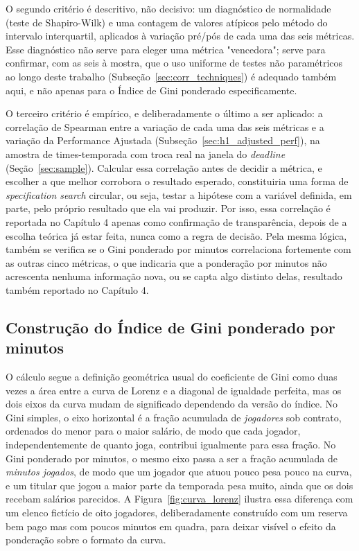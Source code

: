 O segundo critério é descritivo, não decisivo: um diagnóstico de normalidade (teste de Shapiro-Wilk) e uma contagem de valores atípicos pelo método do intervalo interquartil, aplicados à variação pré/pós de cada uma das seis métricas. Esse diagnóstico não serve para eleger uma métrica "vencedora"; serve para confirmar, com as seis à mostra, que o uso uniforme de testes não paramétricos ao longo deste trabalho (Subseção~\ref{sec:corr_techniques}) é adequado também aqui, e não apenas para o Índice de Gini ponderado especificamente.

O terceiro critério é empírico, e deliberadamente o último a ser aplicado: a correlação de Spearman entre a variação de cada uma das seis métricas e a variação da Performance Ajustada (Subseção~\ref{sec:h1_adjusted_perf}), na amostra de times-temporada com troca real na janela do \textit{deadline} (Seção~\ref{sec:sample}). Calcular essa correlação antes de decidir a métrica, e escolher a que melhor corrobora o resultado esperado, constituiria uma forma de \textit{specification search} circular, ou seja, testar a hipótese com a variável definida, em parte, pelo próprio resultado que ela vai produzir. Por isso, essa correlação é reportada no Capítulo 4 apenas como confirmação de transparência, depois de a escolha teórica já estar feita, nunca como a regra de decisão. Pela mesma lógica, também se verifica se o Gini ponderado por minutos correlaciona fortemente com as outras cinco métricas, o que indicaria que a ponderação por minutos não acrescenta nenhuma informação nova, ou se capta algo distinto delas, resultado também reportado no Capítulo 4.

\subsection{Construção do Índice de Gini ponderado por minutos}
\label{sec:h1_gini_formula}

O cálculo segue a definição geométrica usual do coeficiente de Gini como duas vezes a área entre a curva de Lorenz e a diagonal de igualdade perfeita, mas os dois eixos da curva mudam de significado dependendo da versão do índice. No Gini simples, o eixo horizontal é a fração acumulada de \textit{jogadores} sob contrato, ordenados do menor para o maior salário, de modo que cada jogador, independentemente de quanto joga, contribui igualmente para essa fração. No Gini ponderado por minutos, o mesmo eixo passa a ser a fração acumulada de \textit{minutos jogados}, de modo que um jogador que atuou pouco pesa pouco na curva, e um titular que jogou a maior parte da temporada pesa muito, ainda que os dois recebam salários parecidos. A Figura~\ref{fig:curva_lorenz} ilustra essa diferença com um elenco fictício de oito jogadores, deliberadamente construído com um reserva bem pago mas com poucos minutos em quadra, para deixar visível o efeito da ponderação sobre o formato da curva.

